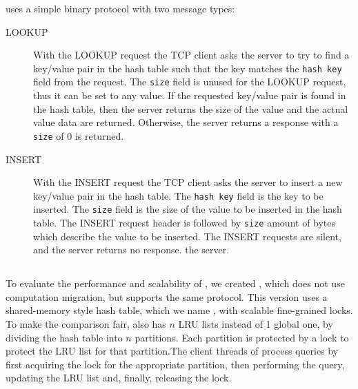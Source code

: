 \cpserver{} uses a simple binary protocol with two message types:
\begin{description}

\item[LOOKUP] With the LOOKUP request the TCP client asks the server to try to
  find a key/value pair in the hash table such that the key matches the
  \texttt{hash key} field from the request. The \texttt{size} field is unused
  for the LOOKUP request, thus it can be set to any value.  If the requested
  key/value pair is found in the hash table, then the server returns the size of
  the value and the actual value data are returned.  Otherwise, the server
  returns a response with a \texttt{size} of 0 is returned.

\item[INSERT] With the INSERT request the TCP client asks the server to insert a
  new key/value pair in the hash table.  The \texttt{hash key} field is the key
  to be inserted. The \texttt{size} field is the size of the value to be
  inserted in the hash table.  The INSERT request header is followed by
  \texttt{size} amount of bytes which describe the value to be inserted. The
  INSERT requests are silent, and the server returns no response.
  the server.

\end{description}

\subsection{\lockserver{}}

To evaluate the performance and scalability of \cphash{}, we created
\lockserver{}, which does not use computation migration, but supports the same
protocol. This version uses a shared-memory style hash table, which we name
\lockhash{}, with scalable fine-grained locks.  To make the comparison fair,
\lockhash{} also has $n$ LRU lists instead of 1 global one, by dividing the hash
table into $n$ partitions.  Each partition is protected by a lock to protect the
LRU list for that partition.The client threads of \lockserver{} process queries
by first acquiring the lock for the appropriate partition, then performing the
query, updating the LRU list and, finally, releasing the lock.  

